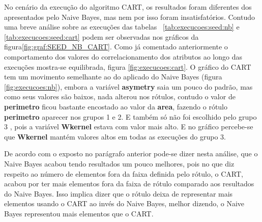 No cenário da execução do algoritmo CART, os resultados foram diferentes dos  apresentados pelo Naive Bayes, mas nem por isso foram insatisfatórios. Contudo uma breve análise sobre as execuções das tabelas ~\ref{tab:execucoes:seed:nb} e \ref{tab:execucoes:seed:cart} podem ser observadas nos gráficos da figura\ref{fig:graf:SEED_NB_CART}. Como já comentado anteriormente o comportamento dos valores do correlacionamento dos atributos ao longo das execuções mostra-se equilibrada, figura \ref{fig:execucoes:cart}. O gráfico do CART tem um movimento semelhante ao do aplicado do Naive Bayes (figura \ref{fig:execucoes:nb}), embora a variável \textbf{asymetry} saia um pouco do padrão, mas como seus valores são baixos, nada alterou nos rótulos, contudo  o valor de \textbf{perimetro} ficou bastante encostado ao valor da \textbf{area}, fazendo o rótulo \textbf{perimetro} aparecer nos grupos 1 e 2. E também só não foi escolhido pelo grupo 3 , pois  a variável \textbf{Wkernel} estava com valor mais alto. E no gráfico percebe-se que  \textbf{Wkernel} mantém valores altos em todas as execuções do grupo 3.

De acordo com o exposto no parágrafo anterior pode-se dizer nesta análise, que o Naive Bayes acabou tendo resultados um pouco melhores, pois no que diz respeito ao número de elementos fora da faixa definida pelo rótulo, o CART, acabou por ter mais elementos fora da faixa de rótulo comparado aos resultados do Naive Bayes. Isso implica dizer que o rótulo deixa de representar mais elementos usando o CART ao invés do Naive Bayes, melhor dizendo, o Naive Bayes representou mais elementos que o CART.


